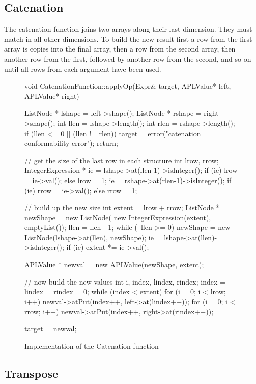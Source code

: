 \subsection{Catenation}

The catenation function joins two arrays along their last dimension.
They must match in all other dimensions.  To build the new result first a
row from the first array is copies into the final array, then a row from
the second array, then another row from the first, followed by another row
from the second, and so on until all rows from each argument have been
used.

\begin{figure}
\begin{cprog}
void CatenationFunction::applyOp(Expr& target, APLValue* left, APLValue* right)
{
	ListNode * lshape = left->shape();
	ListNode * rshape = right->shape();
	int llen = lshape->length();
	int rlen = rshape->length();
	if (llen <= 0 || (llen != rlen)) {
		target = error("catenation conformability error");
		return;
		}

	// get the size of the last row in each structure
	int lrow, rrow;
	IntegerExpression * ie = lshape->at(llen-1)->isInteger();
	if (ie)
		lrow = ie->val();
	else
		lrow = 1;
	ie = rshape->at(rlen-1)->isInteger();
	if (ie)
		rrow = ie->val();
	else
		rrow = 1;

	// build up the new size
	int extent = lrow + rrow;
	ListNode * newShape = new ListNode(
		new IntegerExpression(extent), emptyList());
	llen = llen - 1;
	while (--llen >= 0) {
		newShape = new ListNode(lshape->at(llen), newShape);
		ie = lshape->at(llen)->isInteger();
		if (ie)
			extent *= ie->val();
		}

	APLValue * newval = new APLValue(newShape, extent);

	// now build the new values
	int i, index, lindex, rindex;
	index = lindex = rindex = 0;
	while (index < extent) {
		for (i = 0; i < lrow; i++)
			newval->atPut(index++, left->at(lindex++));
		for (i = 0; i < rrow; i++)
			newval->atPut(index++, right->at(rindex++));
		}

	target = newval;
}
\end{cprog}
\caption{Implementation of the Catenation function}\label{catenation}
\end{figure}

\subsection{Transpose}

